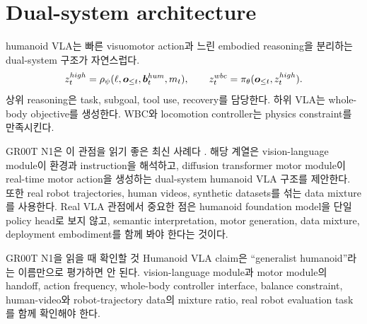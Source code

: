 \section{Dual-system architecture}

humanoid VLA는 빠른 visuomotor action과 느린 embodied reasoning을 분리하는 dual-system 구조가 자연스럽다.
\begin{equation}
  z_t^{high}
  =
  \rho_{\psi}
  (\ell,\bm{o}_{\leq t},\bm{b}_t^{hum},m_t),
  \qquad
  z_t^{wbc}
  =
  \pi_{\theta}
  (\bm{o}_{\leq t},z_t^{high}).
  \label{eq:ch20-dual-system}
\end{equation}
상위 reasoning은 task, subgoal, tool use, recovery를 담당한다. 하위 VLA는 whole-body objective를 생성한다. WBC와 locomotion controller는 physics constraint를 만족시킨다.

GR00T N1은 이 관점을 읽기 좋은 최신 사례다 \cite{grootn12025}. 해당 계열은 vision-language module이 환경과 instruction을 해석하고, diffusion transformer motor module이 real-time motor action을 생성하는 dual-system humanoid VLA 구조를 제안한다. 또한 real robot trajectories, human videos, synthetic datasets를 섞는 data mixture를 사용한다. Real VLA 관점에서 중요한 점은 humanoid foundation model을 단일 policy head로 보지 않고, semantic interpretation, motor generation, data mixture, deployment embodiment를 함께 봐야 한다는 것이다.

\begin{warningbox}{GR00T N1을 읽을 때 확인할 것}
Humanoid VLA claim은 ``generalist humanoid''라는 이름만으로 평가하면 안 된다. vision-language module과 motor module의 handoff, action frequency, whole-body controller interface, balance constraint, human-video와 robot-trajectory data의 mixture ratio, real robot evaluation task를 함께 확인해야 한다.
\end{warningbox}

